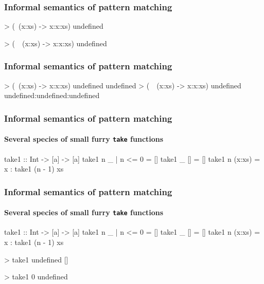 \documentclass{beamer}
\begin{document}

\begin{frame}[fragile]
  \frametitle{Informal semantics of pattern matching}

  \begin{example}
    \begin{code}
> (\  (x:xs) -> x:x:xs) undefined

> (\ ~(x:xs) -> x:x:xs) undefined

    \end{code}
  \end{example}
\end{frame}

\begin{frame}[fragile]
  \frametitle{Informal semantics of pattern matching}

  \begin{example}
    \begin{code}
> (\  (x:xs) -> x:x:xs) undefined
undefined
> (\ ~(x:xs) -> x:x:xs) undefined
undefined:undefined:undefined
    \end{code}
  \end{example}
\end{frame}


\begin{frame}[fragile]
  \frametitle{Informal semantics of pattern matching}
  \framesubtitle{Several species of small furry \texttt{take} functions}

  \begin{code}
take1 :: Int -> [a] -> [a]
take1 n _      | n <= 0 = []
take1 _ []              = []
take1 n (x:xs)          = x : take1 (n - 1) xs
  \end{code}
\end{frame}

\begin{frame}[fragile]
  \frametitle{Informal semantics of pattern matching}
  \framesubtitle{Several species of small furry \texttt{take} functions}

  \begin{code}
take1 :: Int -> [a] -> [a]
take1 n _      | n <= 0 = []
take1 _ []              = []
take1 n (x:xs)          = x : take1 (n - 1) xs
  \end{code}
  \begin{code}
> take1 undefined []

> take1 0 undefined

  \end{code}
\end{frame}
\end{document}
